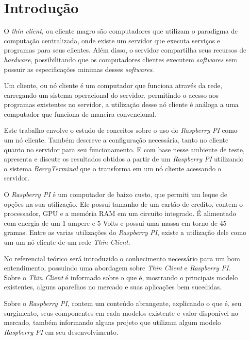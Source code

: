 \chapter{Introdução}



O \textit{thin client}, ou cliente magro são computadores que utilizam o paradigma de computação centralizada, onde existe um servidor que executa serviços e programas para seus clientes. Além disso, o servidor compartilha seus recursos de \textit{hardware}, possibilitando que os computadores clientes executem \textit{softwares} sem possuir as especificações minimas desses \textit{softwares}. 

Um cliente, ou nó cliente é um computador que funciona através da rede, carregando um sistema operacional do servidor, permitindo o acesso aos  programas existentes no servidor, a utilização desse nó cliente é análoga a uma computador que funciona de maneira convencional.

Este trabalho envolve o estudo de conceitos sobre o uso do \textit{Raspberry PI} como um nó cliente. Também descreve a configuração necessária, tanto no cliente quanto no servidor para seu funcionamento. E com base nesse ambiente de teste, apresenta e discute os resultados obtidos a partir de um \textit{Raspberry PI} utilizando o sistema \textit{BerryTerminal} que o transforma em um nó cliente acessando o servidor.

O \textit{Raspberry PI} é um computador de baixo custo, que permiti um leque de opções na sua utilização. Ele possui tamanho de um cartão de credito, contem o processador, GPU e a memória RAM em um circuito integrado. É alimentado com energia de um 1 ampere e 5 Volts e possui uma massa em torno de 45 gramas. Entre as varias utilizações do \textit{Raspberry PI}, existe a utilização dele como um  um nó cliente de um rede \textit{Thin Client}.

No referencial teórico será introduzido o conhecimento necessário para um bom entendimento, possuindo uma abordagem sobre  \textit{Thin Client} e \textit{Raspberry PI}. Sobre o \textit{Thin Client} é informado sobre o que é, mostrando o principais modelo existentes, alguns aparelhos no mercado e suas aplicações bem sucedidas. 

Sobre o \textit{Raspberry PI}, contem um conteúdo abrangente, explicando o que é, seu surgimento, seus componentes em cada modelos existente e valor disponível no mercado, também informando alguns projeto que utilizam algum modelo \textit{Raspberry PI} em seu desenvolvimento.
